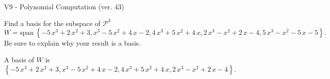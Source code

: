 \begin{exercise}
  \begin{exerciseTitle}V9 - Polynomial Computation (ver. 43)\end{exerciseTitle}
  \begin{exerciseStatement}
    Find a basis for the subspace of \(\mathcal{P}^3\) 
\[W=\mathrm{span}\ \left\{-5 \, x^{3} + 2 \, x^{2} + 3 , x^{3} - 5 \, x^{2} + 4 \, x - 2 , 4 \, x^{3} + 5 \, x^{2} + 4 \, x , 2 \, x^{3} - x^{2} + 2 \, x - 4 , 5 \, x^{3} - x^{2} - 5 \, x - 5\right\}.\]
 Be sure to explain why your result is a basis.


  \end{exerciseStatement}
  \begin{exerciseAnswer}
   A basis of \(W\) is  \(\left\{-5 \, x^{3} + 2 \, x^{2} + 3 , x^{3} - 5 \, x^{2} + 4 \, x - 2 , 4 \, x^{3} + 5 \, x^{2} + 4 \, x , 2 \, x^{3} - x^{2} + 2 \, x - 4\right\}\).
  


  \end{exerciseAnswer}
\end{exercise}